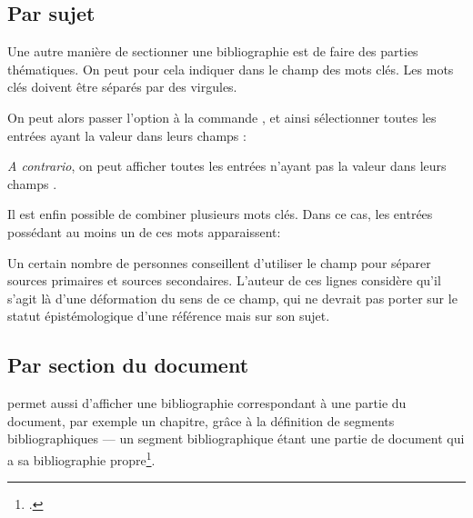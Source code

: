 \subsection{Par sujet}

Une autre manière de  sectionner une bibliographie est de faire des parties thématiques. On peut pour cela indiquer dans le champ   des mots clés. Les mots clés doivent être séparés par des virgules.

On peut alors passer l'option  à la commande , et ainsi sélectionner toutes les entrées ayant la valeur  dans leurs champs  :

\begin{latexcode}
\printbibliography[keyword=xxx]
\end{latexcode}

\emph{A contrario}, on peut afficher toutes les entrées n'ayant pas la valeur  dans leurs champs .

\begin{latexcode}
\printbibliography[notkeyword=xxx]
\end{latexcode}

Il est enfin possible de combiner plusieurs mots clés. Dans ce cas, les entrées possédant au moins un de ces mots apparaissent:

\begin{latexcode}
\printbibliography[keyword=positivistes, keyword=naturalistes]
\end{latexcode}

\begin{plusloins}
    Un certain nombre de personnes conseillent d'utiliser le champ  pour séparer sources primaires et sources secondaires. L'auteur de ces lignes considère qu'il s'agit là d'une déformation du sens de ce champ, qui ne devrait pas porter sur le statut épistémologique d'une référence mais sur son sujet. 
\end{plusloins}

\subsection{Par section du document}

 permet aussi d'afficher une bibliographie correspondant à une partie du document, par exemple un chapitre,  grâce à la définition de segments bibliographiques --- un segment bibliographique étant une partie de document qui a sa bibliographie propre\footcites[En réalité  propose deux choses différentes : \enquote{segment} et \enquote{section} bibliographiques. Seules les sections bibliographiques ont réellement une bibliographie propre, dans la mesure où, si on utilise un style numéroté de bibliographie, la numérotation recommence à chaque changement de section, mais pas à chaque changement de segment. Toutefois il est rare en sciences humaines d'utiliser un style bibliographique numéroté. C'est pourquoi nous ne parlons ici que des segments bibliographiques et non pas des sections bibliographiques. Voir :][]{biblatex_section}{biblatex_segment}.


